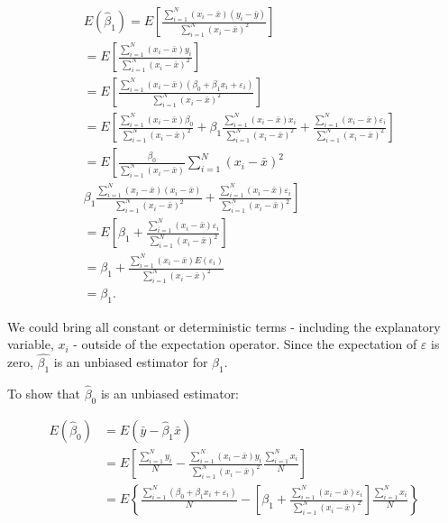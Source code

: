 $$
\begin{aligned}
& E\left(\widehat{\beta}_{1}\right)=E\left[\frac{\sum_{i=1}^{N}\left(x_{i}-\bar{x}\right)\left(y_{i}-\bar{y}\right)}{\sum_{i=1}^{N}\left(x_{i}-\bar{x}\right)^{2}}\right] \\
&=E\left[\frac{\sum_{i=1}^{N}\left(x_{i}-\bar{x}\right) y_{i}}{\sum_{i=1}^{N}\left(x_{i}-\bar{x}\right)^{2}}\right] \\
&=E\left[\frac{\sum_{i=1}^{N}\left(x_{i}-\bar{x}\right)\left(\beta_{0}+\beta_{1} x_{i}+\varepsilon_{i}\right)}{\sum_{i=1}^{N}\left(x_{i}-\bar{x}\right)^{2}}\right] \\
&=E\left[\frac{\sum_{i=1}^{N}\left(x_{i}-\bar{x}\right) \beta_{0}}{\sum_{i=1}^{N}\left(x_{i}-\bar{x}\right)^{2}}+\beta_{1} \frac{\sum_{i=1}^{N}\left(x_{i}-\bar{x}\right) x_{i}}{\sum_{i=1}^{N}\left(x_{i}-\bar{x}\right)^{2}}+\frac{\sum_{i=1}^{N}\left(x_{i}-\bar{x}\right) \varepsilon_{i}}{\sum_{i=1}^{N}\left(x_{i}-\bar{x}\right)^{2}}\right] \\
&=E\left[\frac{\beta_{0}}{\sum_{i=1}^{N}\left(x_{i}-\bar{x}\right)} \sum_{i=1}^{N}\left(x_{i}-\bar{x}\right)^{2}\right. \\
&\left.\beta_{1} \frac{\sum_{i=1}^{N}\left(x_{i}-\bar{x}\right)\left(x_{i}-\bar{x}\right)}{\sum_{i=1}^{N}\left(x_{i}-\bar{x}\right)^{2}}+\frac{\sum_{i=1}^{N}\left(x_{i}-\bar{x}\right) \varepsilon_{i}}{\sum_{i=1}^{N}\left(x_{i}-\bar{x}\right)^{2}}\right] \\
&=E\left[\beta_{1}+\frac{\sum_{i=1}^{N}\left(x_{i}-\bar{x}\right) \varepsilon_{i}}{\sum_{i=1}^{N}\left(x_{i}-\bar{x}\right)^{2}}\right] \\
&=\beta_{1}+\frac{\sum_{i=1}^{N}\left(x_{i}-\bar{x}\right) E\left(\varepsilon_{i}\right)}{\sum_{i=1}^{N}\left(x_{i}-\bar{x}\right)^{2}} \\
&=\beta_{1} .
\end{aligned}
$$

We could bring all constant or deterministic terms - including the explanatory variable, $x_{i}$ - outside of the expectation operator. Since the expectation of $\varepsilon$ is zero, $\widehat{\beta_{1}}$ is an unbiased estimator for $\beta_{1}$.

To show that $\widehat{\beta}_{0}$ is an unbiased estimator:

$$
\begin{aligned}
E\left(\widehat{\beta}_{0}\right) & =E\left(\bar{y}-\widehat{\beta}_{1} \bar{x}\right) \\
& =E\left[\frac{\sum_{i=1}^{N} y_{i}}{N}-\frac{\sum_{i=1}^{N}\left(x_{i}-\bar{x}\right) y_{i}}{\sum_{i=1}^{N}\left(x_{i}-\bar{x}\right)^{2}} \frac{\sum_{i=1}^{N} x_{i}}{N}\right] \\
& =E\left\{\frac{\sum_{i=1}^{N}\left(\beta_{0}+\beta_{1} x_{i}+\varepsilon_{i}\right)}{N}-\left[\beta_{1}+\frac{\sum_{i=1}^{N}\left(x_{i}-\bar{x}\right) \varepsilon_{i}}{\sum_{i=1}^{N}\left(x_{i}-\bar{x}\right)^{2}}\right] \frac{\sum_{i=1}^{N} x_{i}}{N}\right\}
\end{aligned}
$$

